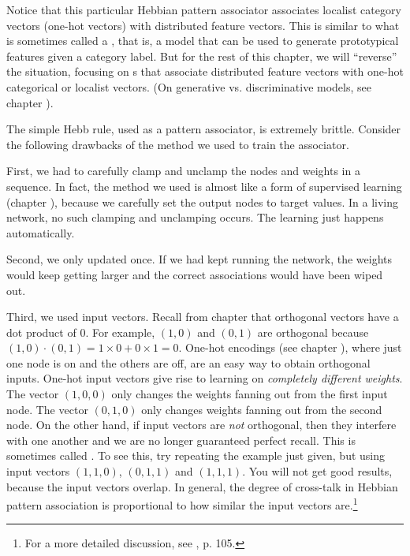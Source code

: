 Notice that this particular Hebbian pattern associator associates localist category vectors (one-hot vectors) with distributed feature vectors. This is similar to what is sometimes called a , that is, a model that can be used to generate prototypical features given a category label.  But for the rest of this chapter, we will ``reverse'' the situation, focusing on s that associate distributed feature vectors with one-hot categorical or localist vectors. (On generative vs. discriminative models, see chapter ).

The simple Hebb rule, used as a pattern associator, is extremely brittle. Consider the following drawbacks of the method we used to train the associator.

First, we had to carefully clamp and unclamp the nodes and weights in a sequence. In fact, the method we used is almost like a form of supervised learning (chapter ), because we carefully set the output nodes to target values. In a living network, no such clamping and unclamping occurs. The learning just happens automatically. 

Second, we only updated once. If we had kept running the network, the weights would keep getting larger and the correct associations would have been wiped out. 

Third, we used  input vectors. Recall from chapter  that orthogonal vectors have a dot product of 0. For example, $(1,0)$ and $(0,1)$ are orthogonal because $(1,0) \cdot (0,1) = 1 \times 0 + 0 \times 1 = 0$. One-hot encodings (see chapter ), where just one node is on and the others are off, are an easy way to obtain orthogonal inputs. One-hot input vectors give rise to learning on \emph{completely different weights}. The vector $(1,0,0)$ only changes the weights fanning out from the first input node. The  vector $(0,1,0)$ only changes weights fanning out from the second node. On the other hand, if input vectors are {\em not} orthogonal, then they interfere with one another and we are no longer guaranteed perfect recall. This is sometimes called . To see this, try repeating the example just given, but using input vectors $(1,1,0)$, $(0,1,1)$ and $(1,1,1)$. You will not get good results, because the input vectors overlap. In general, the degree of cross-talk in Hebbian pattern association  is proportional to how similar the input vectors are.\footnote{For a more detailed discussion, see \cite{fausett1994fundamentals}, p. 105.}

